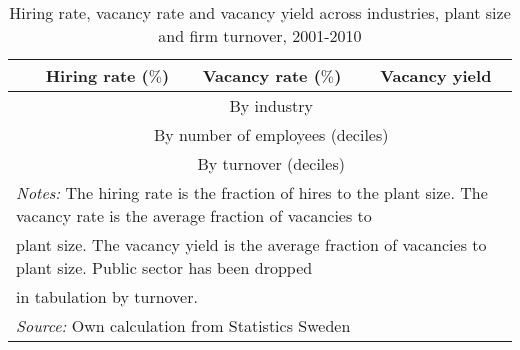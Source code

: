       \begin{table}[htbp]\centering
      \caption{\label{tab:vacancy_yield} Hiring rate, vacancy rate and vacancy yield across industries, plant size and firm turnover, 2001-2010
      \textbf{} }\begin{tabularx} {\textwidth} {  l  c  c  c} \\ \hline %
      \textbf{ } & \textbf{ Hiring rate ($\%$) } & \textbf{ Vacancy rate ($\%$) } & \textbf{  Vacancy yield  } \\
      \midrule
			   & \multicolumn{3}{c}{By industry} \\
			\midrule

     \midrule
						   & \multicolumn{3}{c}{By number of employees (deciles)} \\
			\midrule

     \midrule
						   & \multicolumn{3}{c}{By turnover (deciles)} \\
			\midrule

				\hline
      \multicolumn{4}{l}{\footnotesize{\emph{Notes:} The hiring rate is the fraction of hires to the plant size. The vacancy rate is the average fraction of vacancies to}} \\
				\multicolumn{4}{l}{\footnotesize{plant size. The vacancy yield is the average fraction of vacancies to plant size. Public sector has been dropped} } \\
				\multicolumn{4}{l}{\footnotesize{ in tabulation by turnover.} } \\
      \multicolumn{4}{l}{\footnotesize{\emph{Source:} Own calculation from Statistics Sweden } }

      \end{tabularx}
      \end{table}
